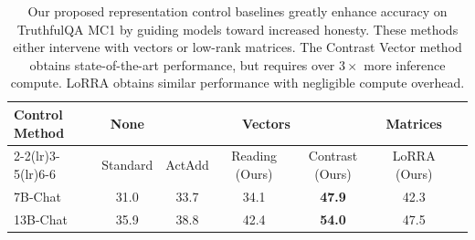 \begin{table}[t]
\vspace{-10pt}

\centering
\begin{tabular}{lcccccc}
\toprule
\multirow{2}{*}{Control Method} & None & \multicolumn{3}{c}{Vectors}  & Matrices \\
 \cmidrule(lr){2-2}\cmidrule(lr){3-5}\cmidrule(lr){6-6}
 & Standard & ActAdd & Reading (Ours) & Contrast (Ours) & LoRRA (Ours) \\ \midrule
7B-Chat & 31.0  & 33.7 & 34.1 & \textbf{47.9} & 42.3        \\
13B-Chat    & 35.9  & 38.8 & 42.4 & \textbf{54.0} & 47.5       \\ \bottomrule
\end{tabular}
\caption{Our proposed representation control baselines greatly enhance accuracy on TruthfulQA MC1 by guiding models toward increased honesty. These methods either intervene with vectors or low-rank matrices. The Contrast Vector method obtains state-of-the-art performance, but requires over $3\times$ more inference compute. LoRRA obtains similar performance with negligible compute overhead.}
\label{tab:tqa_control}
\vspace{-10pt}
\end{table}


